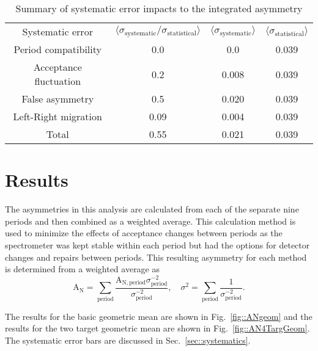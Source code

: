 \begin{table}[h!t]
  \centering
  \begin{tabular}{|c|c|c|c|}
    \hline
    \multirow{2}{*}{Systematic error}&
    \multirow{2}{*}{
      $\langle \sigma_{\mathrm{systematic}}/\sigma_{\mathrm{statistical}}
      \rangle$} &
    \multirow{2}{*}{$\langle \sigma_{\mathrm{systematic}} \rangle$} &
    \multirow{2}{*}{$\langle \sigma_{\mathrm{statistical}} \rangle$} \\
    
    & & & \\ \hline

    Period compatibility& 0.0 & 0.0 & 0.039\\ \hline

    Acceptance fluctuation& 0.2 & 0.008 & 0.039\\ \hline

    False asymmetry& 0.5 & 0.020 & 0.039\\ \hline

    Left-Right migration& 0.09 & 0.004 & 0.039\\ \hline

    Total& 0.55 & 0.021 & 0.039\\\hline
    
  \end{tabular}
  \caption{Summary of systematic error impacts to the integrated asymmetry}
  \label{tab::sysError}
\end{table}


\section{Results}
The asymmetries in this analysis are calculated from each of the separate nine
periods and then combined as a weighted average.  This calculation method is
used to minimize the effects of acceptance changes between periods as the
spectrometer was kept stable within each period but had the options for detector
changes and repairs between periods.  This resulting asymmetry for each method
is determined from a weighted average as
\begin{equation}
  \label{equ::wAvg}
  \mathrm{A}_{\mathrm{N}} = \sum_{\mathrm{period}}
  \frac{\mathrm{A}_{\mathrm{N},\mathrm{period}}\sigma^{-2}_{\mathrm{period}}}{\sigma^{-2}_{\mathrm{period}}},
  \quad \sigma^2 = \sum_{\mathrm{period}}
  \frac{1}{\sigma^{-2}_{\mathrm{period}}}.
\end{equation}

\noindent
The results for the basic geometric mean are shown in
Fig.~\ref{fig::ANgeom} and the results for the two target geometric mean
are shown in Fig.~\ref{fig::AN4TargGeom}.  The systematic error bars are
discussed in Sec.~\ref{sec::systematics}.

